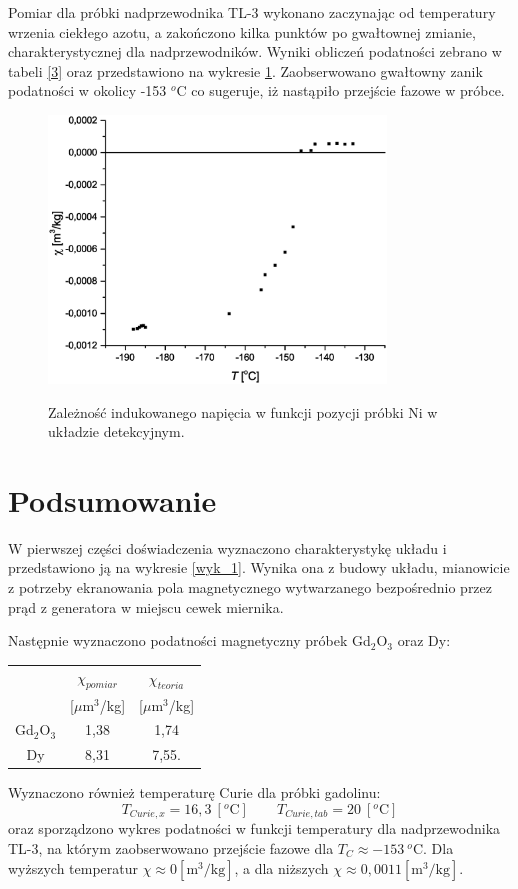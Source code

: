 \documentclass[11pt]{article}
\begin{document}
Pomiar dla próbki nadprzewodnika TL-3 wykonano zaczynając od temperatury wrzenia ciekłego azotu, a zakończono kilka punktów po gwałtownej zmianie, charakterystycznej 
dla nadprzewodników. Wyniki obliczeń podatności zebrano w tabeli \ref{3} oraz przedstawiono na wykresie \ref{wyk_3}. Zaobserwowano gwałtowny zanik podatności w okolicy -153 $^o$C co sugeruje, iż nastąpiło przejście fazowe w próbce. 
\begin{figure}[h!]
\centering
\includegraphics[width=0.8\textwidth]{./img/TL.eps}
\caption{Zależność indukowanego napięcia w funkcji pozycji próbki Ni w układzie detekcyjnym.}{\label{wyk_3}}
\end{figure}
\newpage
\section*{Podsumowanie}
W pierwszej części doświadczenia wyznaczono charakterystykę układu i przedstawiono ją na wykresie \ref{wyk_1}. Wynika ona z budowy układu, mianowicie 
z potrzeby ekranowania pola magnetycznego wytwarzanego bezpośrednio przez prąd z generatora w miejscu cewek miernika.

Następnie wyznaczono podatności magnetyczny próbek Gd$_2$O$_3$ oraz Dy:
\begin{center}\begin{tabular}{ccc}&$\chi_{pomiar}$ & $\chi_{teoria}$ \\  
&[$\mu$m$^3$/kg]&[$\mu$m$^3$/kg] \\
Gd$_2$O$_3$&1,38 & 1,74 \\ 
Dy & 8,31 & 7,55. \end{tabular}\end{center}
Wyznaczono również temperaturę Curie dla próbki gadolinu:
$$ T_{Curie,x} = 16,3\ [^o\mbox{C}] \qquad T_{Curie,tab} = 20\ [^o\mbox{C}]$$
oraz sporządzono wykres podatności w funkcji temperatury dla nadprzewodnika TL-3, na którym zaobserwowano przejście fazowe dla $T_{C} \approx -153\ ^o$C. 
Dla wyższych temperatur $\chi \approx 0 [\mbox{m}^3\mbox{/kg}]$, a dla niższych $\chi \approx 0,0011 [\mbox{m}^3\mbox{/kg}]$.
\end{document}
